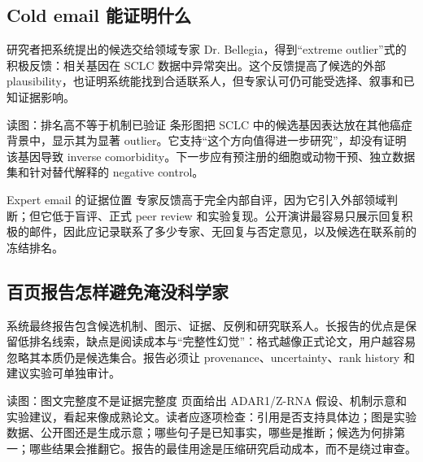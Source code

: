 \subsection{Cold email 能证明什么}

研究者把系统提出的候选交给领域专家 Dr. Bellegia，得到“extreme outlier”式的积极反馈：相关基因在 SCLC 数据中异常突出。这个反馈提高了候选的外部 plausibility，也证明系统能找到合适联系人，但专家认可仍可能受选择、叙事和已知证据影响。


\begin{knowledgebox}{读图：排名高不等于机制已验证}
条形图把 SCLC 中的候选基因表达放在其他癌症背景中，显示其为显著 outlier。它支持“这个方向值得进一步研究”，却没有证明该基因导致 inverse comorbidity。下一步应有预注册的细胞或动物干预、独立数据集和针对替代解释的 negative control。
\end{knowledgebox}

\begin{warningbox}{Expert email 的证据位置}
专家反馈高于完全内部自评，因为它引入外部领域判断；但它低于盲评、正式 peer review 和实验复现。公开演讲最容易只展示回复积极的邮件，因此应记录联系了多少专家、无回复与否定意见，以及候选在联系前的冻结排名。
\end{warningbox}


\subsection{百页报告怎样避免淹没科学家}

系统最终报告包含候选机制、图示、证据、反例和研究联系人。长报告的优点是保留低排名线索，缺点是阅读成本与“完整性幻觉”：格式越像正式论文，用户越容易忽略其本质仍是候选集合。报告必须让 provenance、uncertainty、rank history 和建议实验可单独审计。


\begin{knowledgebox}{读图：图文完整度不是证据完整度}
页面给出 ADAR1/Z-RNA 假设、机制示意和实验建议，看起来像成熟论文。读者应逐项检查：引用是否支持具体边；图是实验数据、公开图还是生成示意；哪些句子是已知事实，哪些是推断；候选为何排第一；哪些结果会推翻它。报告的最佳用途是压缩研究启动成本，而不是绕过审查。
\end{knowledgebox}

